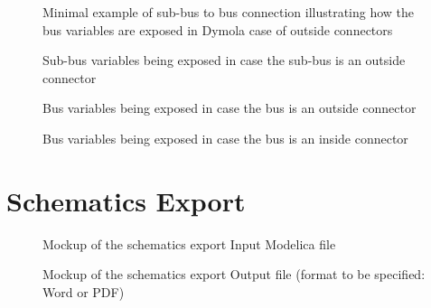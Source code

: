 \documentclass[letterpaper,10pt, openany,english]{sphinxmanual}
\begin{document}
\begin{figure}[htbp]
\centering
\capstart

\noindent{}
\caption{Minimal example of sub-bus to bus connection illustrating how the bus variables are exposed in Dymola \textendash{} case of outside connectors}\label{\detokenize{requirements:bus-minimal}}\end{figure}

\begin{figure}[htbp]
\centering
\capstart

\noindent{}
\caption{Sub-bus variables being exposed in case the sub-bus is an outside connector}\label{\detokenize{requirements:subbus-outside}}\end{figure}

\begin{figure}[htbp]
\centering
\capstart

\noindent{}
\caption{Bus variables being exposed in case the bus is an outside connector}\label{\detokenize{requirements:bus-outside}}\end{figure}

\begin{figure}[htbp]
\centering
\capstart

\noindent{}
\caption{Bus variables being exposed in case the bus is an inside connector}\label{\detokenize{requirements:bus-inside}}\end{figure}


\section{Schematics Export}
\label{\detokenize{requirements:schematics-export}}\label{\detokenize{requirements:par-schematics-export}}
\begin{figure}[htbp]
\centering
\capstart

\noindent{}
\caption{Mockup of the schematics export \textendash{} Input Modelica file}\label{\detokenize{requirements:screen-schematics-modelica}}\end{figure}

\begin{figure}[htbp]
\centering
\capstart

\noindent{}
\caption{Mockup of the schematics export \textendash{} Output file (format to be specified: Word or PDF)}\label{\detokenize{requirements:screen-schematics-output}}\end{figure}
\end{document}
